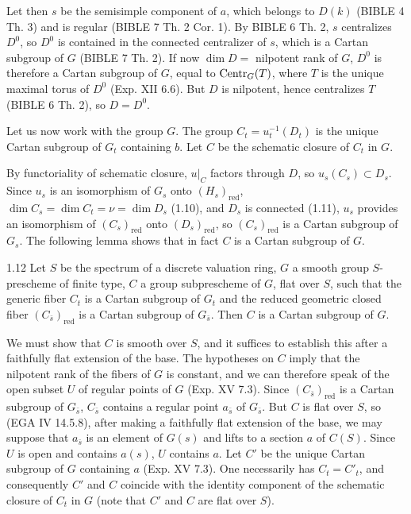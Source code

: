 Let then $s$ be the semisimple component of $a$, which belongs to $D(k)$ (BIBLE 4 Th. 3) and is regular (BIBLE 7 Th. 2 Cor. 1). By BIBLE 6 Th. 2, $s$ centralizes $D^0$, so $D^0$ is contained in the connected centralizer of $s$, which is a Cartan subgroup of $G$ (BIBLE 7 Th. 2). If now $\dim D=$ nilpotent rank of $G$, $D^0$ is therefore a Cartan subgroup of $G$, equal to $\operatorname{Centr}_G(T)$, where $T$ is the unique maximal torus of $D^0$ (Exp. XII 6.6). But $D$ is nilpotent, hence centralizes $T$ (BIBLE 6 Th. 2), so $D=D^0$.

Let us now work with the group $G$. The group $C_t=u_t^{-1}(D_t)$ is the unique Cartan subgroup of $G_t$ containing $b$. Let $C$ be the schematic closure of $C_t$ in $G$.

By functoriality of schematic closure, $u|_C$ factors through $D$, so $u_s(C_s)\subset D_s$. Since $u_s$ is an isomorphism of $G_s$ onto $(H_s)_{\mathrm{red}}$, $\dim C_s=\dim C_t=\nu=\dim D_s$ (1.10), and $D_s$ is connected (1.11), $u_s$ provides an isomorphism of $(C_s)_{\mathrm{red}}$ onto $(D_s)_{\mathrm{red}}$, so $(C_s)_{\mathrm{red}}$ is a Cartan subgroup of $G_s$. The following lemma shows that in fact $C$ is a Cartan subgroup of $G$.

\begin{lemma}{1.12}\label{XVI.1.12}
Let $S$ be the spectrum of a discrete valuation ring, $G$ a smooth group $S$-prescheme of finite type, $C$ a group subprescheme of $G$, flat over $S$, such that the generic fiber $C_t$ is a Cartan subgroup of $G_t$ and the reduced geometric closed fiber $(C_{\bar s})_{\mathrm{red}}$ is a Cartan subgroup of $G_{\bar s}$. Then $C$ is a Cartan subgroup of $G$.
\end{lemma}
We must show that $C$ is smooth over $S$, and it suffices to establish this after a faithfully flat extension of the base. The hypotheses on $C$ imply that the nilpotent rank of the fibers of $G$ is constant, and we can therefore speak of the open subset $U$ of regular points of $G$ (Exp. XV 7.3). Since $(C_{\bar s})_{\mathrm{red}}$ is a Cartan subgroup of $G_{\bar s}$, $C_{\bar s}$ contains a regular point $a_{\bar s}$ of $G_{\bar s}$. But $C$ is flat over $S$, so (EGA IV 14.5.8), after making a faithfully flat extension of the base, we may suppose that $a_{\bar s}$ is an element of $G(s)$ and lifts to a section $a$ of $C(S)$. Since $U$ is open and contains $a(s)$, $U$ contains $a$. Let $C'$ be the unique Cartan subgroup of $G$ containing $a$ (Exp. XV 7.3). One necessarily has $C_t=C'_t$, and consequently $C'$ and $C$ coincide with the identity component of the schematic closure of $C_t$ in $G$ (note that $C'$ and $C$ are flat over $S$).

